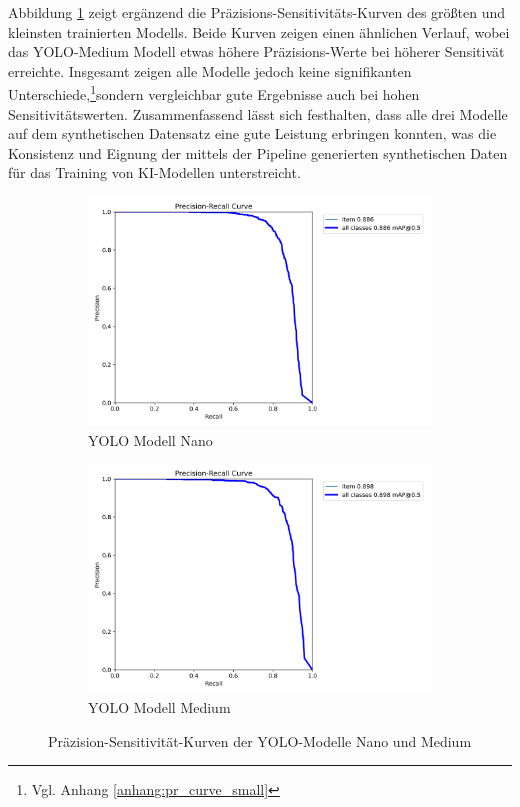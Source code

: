 Abbildung \ref{fig:pr_kurven} zeigt ergänzend die Präzisions-Sensitivitäts-Kurven des größten und kleinsten trainierten Modells. Beide Kurven zeigen einen ähnlichen Verlauf, wobei das \ac{YOLO}-Medium Modell etwas höhere Präzisions-Werte bei höherer Sensitivät erreichte. Insgesamt zeigen alle Modelle jedoch keine signifikanten Unterschiede,\footnote{Vgl. Anhang \ref{anhang:pr_curve_small}}sondern vergleichbar gute Ergebnisse auch bei hohen Sensitivitätswerten. 
Zusammenfassend lässt sich festhalten, dass alle drei Modelle auf dem synthetischen Datensatz eine gute Leistung erbringen konnten, was die Konsistenz und Eignung der mittels der Pipeline generierten synthetischen Daten für das Training von \ac{KI}-Modellen unterstreicht.

\begin{figure}[htb]
    \centering
    \begin{subfigure}{0.49\textwidth}
        \includegraphics[width=\textwidth]{graphics/yolo_eval/model_n/BoxPR_curve.png}
        \caption{\ac{YOLO} Modell Nano}
    \end{subfigure}
    \hfill
    \begin{subfigure}{0.49\textwidth}
        \includegraphics[width=\textwidth]{graphics/yolo_eval/model_m/BoxPR_curve.png}
        \caption{\ac{YOLO} Modell Medium}
    \end{subfigure}
    \caption{Präzision-Sensitivität-Kurven der \ac{YOLO}-Modelle Nano und Medium}
    \label{fig:pr_kurven}
\end{figure}


